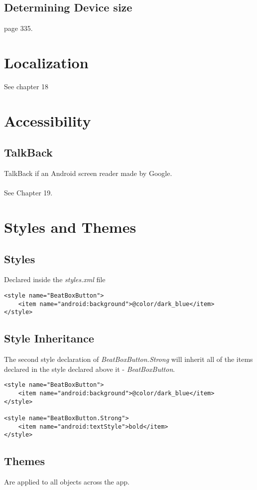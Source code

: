 \documentclass[]{article}
\begin{document}
\subsection{Determining Device size}
page 335.

\section{Localization}
See chapter 18

\section{Accessibility}
\subsection{TalkBack}
TalkBack if an Android screen reader made by Google.
\\\\
See Chapter 19.

\section{Styles and Themes}
\subsection{Styles}
Declared inside the \textit{styles.xml} file
\begin{lstlisting}
<style name="BeatBoxButton">
	<item name="android:background">@color/dark_blue</item>
</style>
\end{lstlisting}

\subsection{Style Inheritance}
The second style declaration of \textit{BeatBoxButton.Strong} will inherit all of the items declared in the style declared above it - \textit{BeatBoxButton}.
\begin{lstlisting}
<style name="BeatBoxButton">
	<item name="android:background">@color/dark_blue</item>
</style>

<style name="BeatBoxButton.Strong">
	<item name="android:textStyle">bold</item>
</style>
\end{lstlisting}

\subsection{Themes}
Are applied to all objects across the app.
\end{document}
